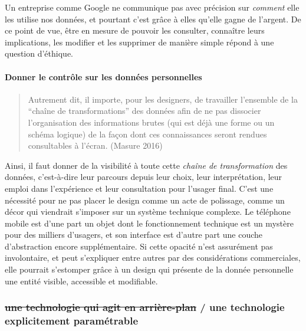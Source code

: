 \documentclass[]{article}
\let\oldparagraph\paragraph
\renewcommand{\paragraph}[1]{\oldparagraph{#1}\mbox{}}
\begin{document}
Un entreprise comme Google ne communique pas avec précision sur
\emph{comment} elle les utilise nos données, et pourtant c'est grâce à
elles qu'elle gagne de l'argent. De ce point de vue, être en mesure de
pouvoir les consulter, connaître leurs implications, les modifier et les
supprimer de manière simple répond à une question d'éthique.

\hypertarget{donner-le-contruxf4le-sur-les-donnuxe9es-personnelles}{%
\paragraph{Donner le contrôle sur les données
personnelles}\label{donner-le-contruxf4le-sur-les-donnuxe9es-personnelles}}

\begin{quote}
Autrement dit, il importe, pour les designers, de travailler l'ensemble
de la ``chaîne de transformations'' des données afin de ne pas dissocier
l'organisation des informations brutes (qui est déjà une forme ou un
schéma logique) de la façon dont ces connaissances seront rendues
consultables à l'écran. (Masure 2016)
\end{quote}

Ainsi, il faut donner de la visibilité à toute cette \emph{chaîne de
transformation} des données, c'est-à-dire leur parcours depuis leur
choix, leur interprétation, leur emploi dans l'expérience et leur
consultation pour l'usager final. C'est une nécessité pour ne pas placer
le design comme un acte de polissage, comme un décor qui viendrait
s'imposer sur un système technique complexe. Le téléphone mobile est
d'une part un objet dont le fonctionnement technique est un mystère pour
des milliers d'usagers, et son interface est d'autre part une couche
d'abstraction encore supplémentaire. Si cette opacité n'est assurément
pas involontaire, et peut s'expliquer entre autres par des
considérations commerciales, elle pourrait s'estomper grâce à un design
qui présente de la donnée personnelle une entité visible, accessible et
modifiable.

\newpage

\hypertarget{une-technologie-qui-agit-en-arriuxe8re-plan-une-technologie-explicitement-paramuxe9trable}{%
\subsubsection{\texorpdfstring{\sout{une technologie qui agit en
arrière-plan} / une technologie explicitement
paramétrable}{une technologie qui agit en arrière-plan / une technologie explicitement paramétrable}}\label{une-technologie-qui-agit-en-arriuxe8re-plan-une-technologie-explicitement-paramuxe9trable}}
\end{document}
